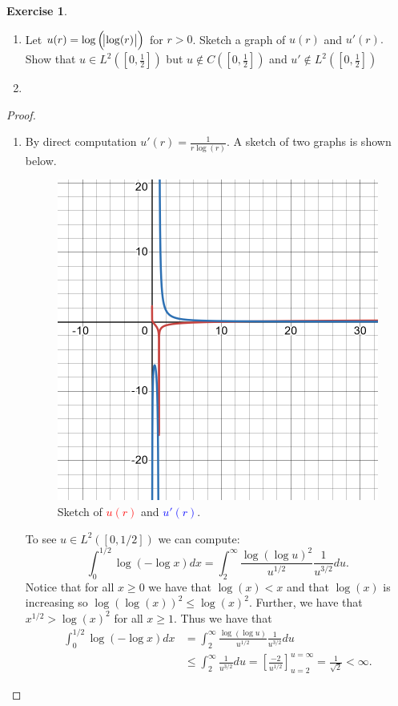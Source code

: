 \documentclass{amsart}
\theoremstyle{plain}
\theoremstyle{definition}
\newtheorem{exer}{Exercise}[section]
\begin{document}
\begin{exer}
    \begin{enumerate}[label=\alph*.]
        \item Let $u(r) = \log\left(\abs{\log(r)}\right)$ for $r> 0$. Sketch a graph of $u(r)$ and $u'(r).$ Show that $u\in L^2\left(\left[0,\frac{1}{2}\right]\right)$ but $u\not \in C\left(\left[0,\frac{1}{2}\right]\right)$ and $u' \not \in L^2\left(\left[0,\frac{1}{2}\right]\right)$
        \item
    \end{enumerate}
\end{exer}
\begin{proof}
    \begin{enumerate}[label=\alph*.]
        \item By direct computation $u'(r) = \frac{1}{r\log(r)}$. A sketch of two graphs is shown below.
        \begin{figure}[h!]
            \centering
            \includegraphics[width=0.5\linewidth]{Chapter 1/Photos/Problem12A.png}
            \caption{Sketch of \textcolor{red}{$u(r)$} and \textcolor{blue}{$u'(r)$}.}
            \label{fig:12a}
        \end{figure}
        To see $u\in L^2([0,1/2])$ we can compute:
        $$\int_0^{1/2} \log\left(-\log x\right) dx = \int_{2}^{\infty} \frac{\log\left(\log u\right)^2}{u^{1/2}}\frac{1}{u^{3/2}}du.$$ Notice that for all $x\geq 0$ we have that $\log(x) < x$ and that $\log(x)$ is increasing so $\log(\log(x))^2 \leq \log(x)^2.$ 
        Further, we have that $x^{1/2} > \log(x)^2$ for all $x\geq 1$. Thus we have that
        \begin{align*}
            \int_0^{1/2} \log\left(-\log x\right) dx &= \int_{2}^{\infty} \frac{\log\left(\log u\right)}{u^{1/2}}\frac{1}{u^{3/2}}du\\
            &\leq \int_2^\infty \frac{1}{u^{3/2}} du = \left[\frac{-2}{u^{1/2}}\right]_{u=2}^{u=\infty} =  \frac{1}{\sqrt{2}} < \infty.

\end{align*}
\end{enumerate}
\end{proof}
\end{document}
